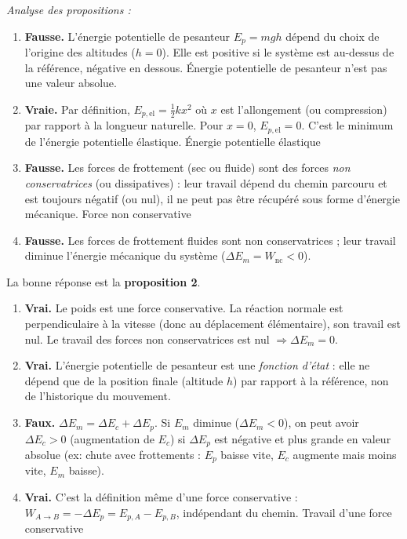 \documentclass[11pt]{article}
\newcommand{\cle}[1]{{\popxbold\color{popdark}#1}}
\begin{document}
\begin{corrige}
\emph{Analyse des propositions :}
\begin{enumerate}
    \item \textbf{Fausse.} L'énergie potentielle de pesanteur $E_p = mgh$ dépend du choix de l'origine des altitudes ($h=0$). Elle est positive si le système est au-dessus de la référence, négative en dessous. \cle{Énergie potentielle de pesanteur} n'est pas une valeur absolue.
    \item \textbf{Vraie.} Par définition, $E_{p,\text{el}} = \frac{1}{2}k x^2$ où $x$ est l'allongement (ou compression) par rapport à la longueur naturelle. Pour $x=0$, $E_{p,\text{el}}=0$. C'est le minimum de l'énergie potentielle élastique. \cle{Énergie potentielle élastique}
    \item \textbf{Fausse.} Les forces de frottement (sec ou fluide) sont des forces \emph{non conservatrices} (ou dissipatives) : leur travail dépend du chemin parcouru et est toujours négatif (ou nul), il ne peut pas être récupéré sous forme d'énergie mécanique. \cle{Force non conservative}
    \item \textbf{Fausse.} Les forces de frottement fluides sont non conservatrices ; leur travail diminue l'énergie mécanique du système ($\Delta E_m = W_{\text{nc}} < 0$).
\end{enumerate}
La bonne réponse est la \textbf{proposition 2}.
\end{corrige}

\begin{corrige}
\begin{enumerate}
    \item \textbf{Vrai.} Le poids est une force \cle{conservative}. La réaction normale est perpendiculaire à la vitesse (donc au déplacement élémentaire), son travail est nul. Le travail des forces non conservatrices est nul $\Rightarrow \Delta E_m = 0$.
    \item \textbf{Vrai.} L'énergie potentielle de pesanteur est une \emph{fonction d'état} : elle ne dépend que de la position finale (altitude $h$) par rapport à la référence, non de l'historique du mouvement.
    \item \textbf{Faux.} $\Delta E_m = \Delta E_c + \Delta E_p$. Si $E_m$ diminue ($\Delta E_m < 0$), on peut avoir $\Delta E_c > 0$ (augmentation de $E_c$) si $\Delta E_p$ est négative et plus grande en valeur absolue (ex: chute avec frottements : $E_p$ baisse vite, $E_c$ augmente mais moins vite, $E_m$ baisse).
    \item \textbf{Vrai.} C'est la définition même d'une force conservative : $W_{A\to B} = -\Delta E_p = E_{p,A} - E_{p,B}$, indépendant du chemin. \cle{Travail d'une force conservative}
\end{enumerate}
\end{corrige}
\end{document}
